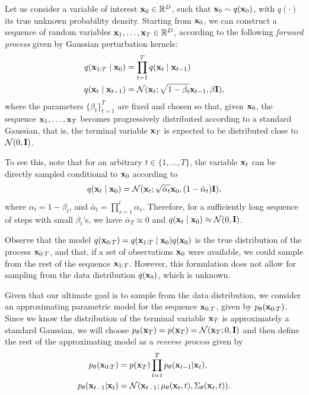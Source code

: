 Let us consider a variable of interest ${ \mathbf{x}}_0\in{\mathbb R}^D$, such that ${ \mathbf{x}}_0\sim q({ \mathbf{x}}_0)$, with $q(\cdot)$ its true unknown probability density. Starting from ${ \mathbf{x}}_0$, we can construct a sequence of random variables ${ \mathbf{x}}_1,\ldots,{ \mathbf{x}}_T\in{\mathbb R}^D$, according to the following \emph{forward process} given by Gaussian perturbation kernels: 
\begin{align}
    q ({ \mathbf{x}}_{1:T} \mid { \mathbf{x}}_0) &= \prod_{t=1}^T q({ \mathbf{x}}_t \mid { \mathbf{x}}_{t-1})
    \label{eq:diff_q_factor}\\
    q({ \mathbf{x}}_t \mid { \mathbf{x}}_{t-1}) &= {\mathcal N}({ \mathbf{x}}_t; \sqrt{1-\beta_t}{ \mathbf{x}}_{t-1},\beta{\mathbf I}), \label{eq:diff_q_def}
\end{align}
where the parameters $\{\beta_t\}_{t=1}^T$ are fixed and chosen so that, given ${ \mathbf{x}}_0$, the sequence ${ \mathbf{x}}_1,\ldots,{ \mathbf{x}}_T$ becomes progressively distributed according to a standard Gaussian, that is, the terminal variable ${ \mathbf{x}}_T$ is expected to be distributed close to ${\mathcal N}(0,{\mathbf I})$. 

To see this, note that for an arbitrary $t\in\{1,\ldots,T\}$, the variable ${ \mathbf{x}}_t$ can be directly sampled conditional to ${ \mathbf{x}}_0$ according to 
\begin{equation}
    q({ \mathbf{x}}_t \mid { \mathbf{x}}_0) = {\mathcal N}({ \mathbf{x}}_t; \sqrt{\bar\alpha_t}{ \mathbf{x}}_0, (1-\bar\alpha_t){\mathbf I}),   
    \label{eq:noisy_sample_from_x0} 
\end{equation}
where $\alpha_t = 1-\beta_t$, and $\bar\alpha_t = \prod_{s=1}^{t}\alpha_s$. Therefore, for a sufficiently long sequence of steps with small $\beta_t$'s, we have $\bar\alpha_T\approx 0$ and $q({ \mathbf{x}}_t \mid { \mathbf{x}}_0) \approx {\mathcal N}(0,{\mathbf I})$.

\begin{remark}
    Observe that the model $q({ \mathbf{x}}_{0:T}) = q({ \mathbf{x}}_{1:T} \mid { \mathbf{x}}_0)q({ \mathbf{x}}_{0})$ is the true distribution of the process ${ \mathbf{x}}_{0:T}$, and that, if a set of observations ${ \mathbf{x}}_0$ were available, we could sample from the rest of the sequence ${ \mathbf{x}}_{1:T}$. However, this formulation does not allow for sampling from the data distribution $q({ \mathbf{x}}_{0})$, which is unknown.  
\end{remark}

Given that our ultimate goal is to sample from the data distribution, we consider an approximating  parametric model for the sequence ${ \mathbf{x}}_{0:T}$, given by $p_\theta({ \mathbf{x}}_{0:T})$. Since we know the distribution of the terminal variable ${ \mathbf{x}}_T$ is approximately a standard Gaussian, we will choose $p_\theta({ \mathbf{x}}_T) = p({ \mathbf{x}}_T)= {\mathcal N}({ \mathbf{x}}_T; 0, {\mathbf I})$ and then define the rest of the approximating model as a \emph{reverse process} given by 
\begin{align}
    p_\theta ({ \mathbf{x}}_{0:T}) &= p({ \mathbf{x}}_T) \prod_{t=1}^T p_\theta({ \mathbf{x}}_{t-1} | { \mathbf{x}}_t),\label{eq:diff_p_factor}\\
    p_\theta({ \mathbf{x}}_{t-1} | { \mathbf{x}}_t) &= {\mathcal N}({ \mathbf{x}}_{t-1}; \mu_\theta({ \mathbf{x}}_t,t), \Sigma_\theta({ \mathbf{x}}_t,t)).
    \label{eq:diff_p_def}
\end{align}

